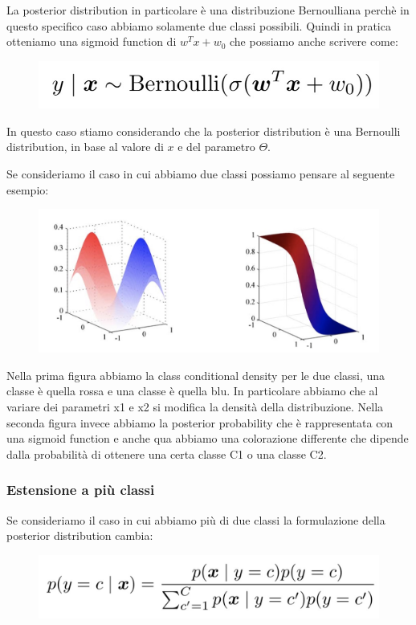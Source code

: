 \documentclass[14pt]{extreport}
\begin{document}
La posterior distribution in particolare è una distribuzione Bernoulliana perchè in questo specifico caso abbiamo solamente due classi possibili.
Quindi in pratica otteniamo una sigmoid function di $w^Tx+w_0$ che possiamo anche scrivere come:

\begin{figure}[H]
	\centering
	\includegraphics[width=0.5\linewidth]{173.jpeg}
\end{figure}

In questo caso stiamo considerando che la posterior distribution è una Bernoulli distribution, in base al valore di $x$ e del parametro $\Theta$.


Se consideriamo il caso in cui abbiamo due classi possiamo pensare al seguente esempio:

\begin{figure}[H]
	\centering
	\includegraphics[width=0.7\linewidth]{174.jpeg}
\end{figure}

Nella prima figura abbiamo la class conditional density per le due classi, una classe è quella rossa e una classe è quella blu. In particolare abbiamo
che al variare dei parametri x1 e x2 si modifica la densità della distribuzione. Nella seconda figura invece abbiamo la posterior probability che è
rappresentata con una sigmoid function e anche qua abbiamo una colorazione differente che dipende dalla probabilità di ottenere una certa classe C1 o
una classe C2.

\subsubsection{Estensione a più classi}

Se consideriamo il caso in cui abbiamo più di due classi la formulazione della posterior distribution cambia:

\begin{figure}[H]
	\centering
	\includegraphics[width=0.7\linewidth]{176.jpeg}
\end{figure}
\end{document}
